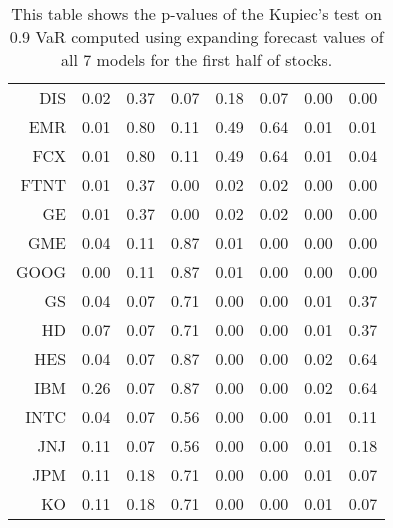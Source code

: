 \begin{table}[ht]
\begin{tabular}{rrrrrrrr}
  DIS & 0.02 & 0.37 & 0.07 & 0.18 & 0.07 & 0.00 & 0.00 \\ 
  EMR & 0.01 & 0.80 & 0.11 & 0.49 & 0.64 & 0.01 & 0.01 \\ 
  FCX & 0.01 & 0.80 & 0.11 & 0.49 & 0.64 & 0.01 & 0.04 \\ 
  FTNT & 0.01 & 0.37 & 0.00 & 0.02 & 0.02 & 0.00 & 0.00 \\ 
  GE & 0.01 & 0.37 & 0.00 & 0.02 & 0.02 & 0.00 & 0.00 \\ 
  GME & 0.04 & 0.11 & 0.87 & 0.01 & 0.00 & 0.00 & 0.00 \\ 
  GOOG & 0.00 & 0.11 & 0.87 & 0.01 & 0.00 & 0.00 & 0.00 \\ 
  GS & 0.04 & 0.07 & 0.71 & 0.00 & 0.00 & 0.01 & 0.37 \\ 
  HD & 0.07 & 0.07 & 0.71 & 0.00 & 0.00 & 0.01 & 0.37 \\ 
  HES & 0.04 & 0.07 & 0.87 & 0.00 & 0.00 & 0.02 & 0.64 \\ 
  IBM & 0.26 & 0.07 & 0.87 & 0.00 & 0.00 & 0.02 & 0.64 \\ 
  INTC & 0.04 & 0.07 & 0.56 & 0.00 & 0.00 & 0.01 & 0.11 \\ 
  JNJ & 0.11 & 0.07 & 0.56 & 0.00 & 0.00 & 0.01 & 0.18 \\ 
  JPM & 0.11 & 0.18 & 0.71 & 0.00 & 0.00 & 0.01 & 0.07 \\ 
  KO & 0.11 & 0.18 & 0.71 & 0.00 & 0.00 & 0.01 & 0.07 \\ 
   \hline
\end{tabular}
\caption[Kupiec's test p-values, alpha =0.9 (1)]{This table shows the p-values of the Kupiec's test on 0.9 VaR computed using expanding forecast values of all 7 models for the first half of stocks.} 
\label{Table:Kupiec_test_expanding_0.9_1}
\end{table}
